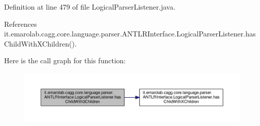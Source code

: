 Definition at line 479 of file Logical\-Parser\-Listener.\-java.



References it.\-emarolab.\-cagg.\-core.\-language.\-parser.\-A\-N\-T\-L\-R\-Interface.\-Logical\-Parser\-Listener.\-has\-Child\-With\-X\-Children().



Here is the call graph for this function\-:\nopagebreak
\begin{figure}[H]
\begin{center}
\leavevmode
\includegraphics[width=350pt]{classit_1_1emarolab_1_1cagg_1_1core_1_1language_1_1parser_1_1ANTLRInterface_1_1LogicalParserListener_ae717015087f91015159e8dd4c54ab08e_cgraph}
\end{center}
\end{figure}


